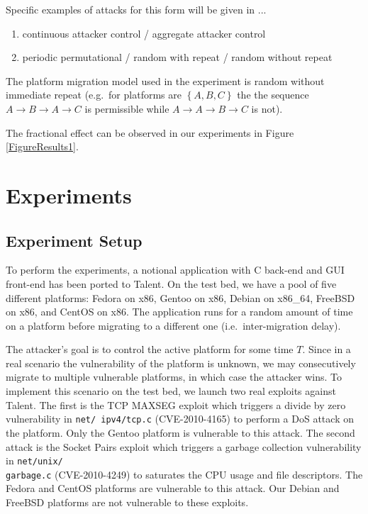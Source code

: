 \documentclass{acm_proc_article-sp}
\begin{document}
Specific examples of attacks for this form will be given in ...
\begin{enumerate}
\item continuous attacker control / aggregate attacker control
\item periodic permutational / random with repeat / random without repeat
\end{enumerate}
The platform migration model used in the experiment is random without immediate repeat (e.g.~for platforms are $\left\{
A,B,C\right\} $ the the sequence $A\rightarrow B\rightarrow A\rightarrow C$ is permissible while $A\rightarrow
A\rightarrow B\rightarrow C$ is not). 

The fractional effect can be observed in our experiments in Figure \ref{FigureResults1}.

\section{Experiments}
\label{Exper}

\subsection{Experiment Setup}

To perform the experiments, a notional application with C back-end and GUI front-end has been ported to Talent. On the test bed, we have a pool of five different platforms: Fedora on x86, Gentoo on x86, Debian on x86\_64, FreeBSD on x86, and CentOS on x86. The application runs for a random amount of time on a platform before migrating to a different one (i.e.~inter-migration delay). 

The attacker's goal is to control the active platform for some time $T$. Since in a real scenario the vulnerability of the platform is unknown, we may consecutively migrate to multiple vulnerable platforms, in which case the attacker wins. To implement this scenario on the test bed, we launch two real exploits against Talent. The first is the TCP MAXSEG exploit which triggers a divide by zero vulnerability in \texttt{net/ ipv4/tcp.c} (CVE-2010-4165) to perform a DoS attack on the platform. Only the Gentoo platform is vulnerable to this attack. The second attack is the Socket Pairs exploit which triggers a garbage collection vulnerability in \texttt{net/unix/ \\garbage.c} (CVE-2010-4249) to saturates the CPU usage and file descriptors. The Fedora and CentOS platforms are vulnerable to this attack. Our Debian and FreeBSD platforms are not vulnerable to these exploits.
\end{document}
